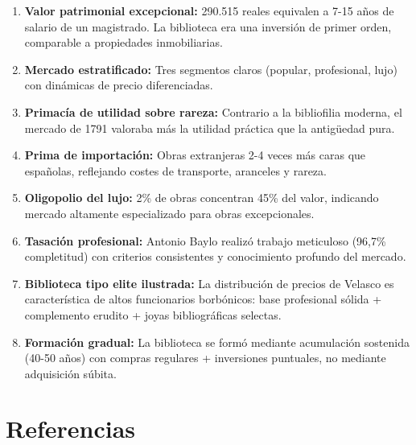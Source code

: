 \documentclass[12pt,a4paper]{article}
\begin{document}
\begin{enumerate}
    \item \textbf{Valor patrimonial excepcional:} 290.515 reales equivalen a 7-15 años de salario de un magistrado. La biblioteca era una inversión de primer orden, comparable a propiedades inmobiliarias.

    \item \textbf{Mercado estratificado:} Tres segmentos claros (popular, profesional, lujo) con dinámicas de precio diferenciadas.

    \item \textbf{Primacía de utilidad sobre rareza:} Contrario a la bibliofilia moderna, el mercado de 1791 valoraba más la utilidad práctica que la antigüedad pura.

    \item \textbf{Prima de importación:} Obras extranjeras 2-4 veces más caras que españolas, reflejando costes de transporte, aranceles y rareza.

    \item \textbf{Oligopolio del lujo:} 2\% de obras concentran 45\% del valor, indicando mercado altamente especializado para obras excepcionales.

    \item \textbf{Tasación profesional:} Antonio Baylo realizó trabajo meticuloso (96,7\% completitud) con criterios consistentes y conocimiento profundo del mercado.

    \item \textbf{Biblioteca tipo elite ilustrada:} La distribución de precios de Velasco es característica de altos funcionarios borbónicos: base profesional sólida + complemento erudito + joyas bibliográficas selectas.

    \item \textbf{Formación gradual:} La biblioteca se formó mediante acumulación sostenida (40-50 años) con compras regulares + inversiones puntuales, no mediante adquisición súbita.
\end{enumerate}

\section{Referencias}
\end{document}
